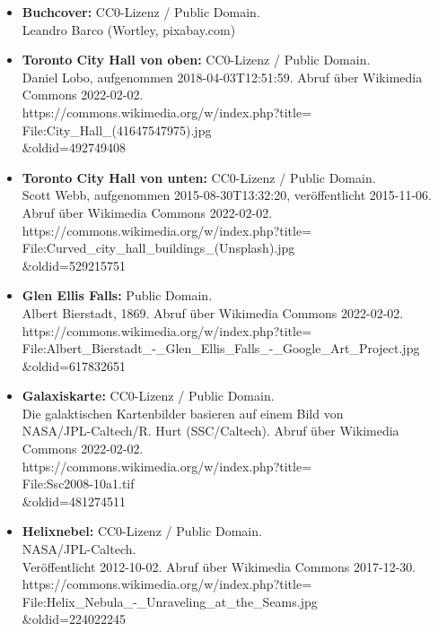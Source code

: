 \begin{itemize}
    \item \textbf{Buchcover:} CC0-Lizenz / Public Domain.\\ Leandro Barco (Wortley, pixabay.com)
    \item \textbf{Toronto City Hall von oben:} CC0-Lizenz / Public Domain.\\ Daniel Lobo, aufgenommen 2018-04-03T12:51:59. Abruf über Wikimedia Commons 2022-02-02.\\ https://commons.wikimedia.org/w/index.php?title=\\File:City\_Hall\_(41647547975).jpg\\\&oldid=492749408
    \item \textbf{Toronto City Hall von unten:} CC0-Lizenz / Public Domain.\\ Scott Webb, aufgenommen 2015-08-30T13:32:20, veröffentlicht 2015-11-06. Abruf über Wikimedia Commons 2022-02-02.\\ https://commons.wikimedia.org/w/index.php?title=\\File:Curved\_city\_hall\_buildings\_(Unsplash).jpg\\\&oldid=529215751
    \item \textbf{Glen Ellis Falls:} Public Domain.\\ Albert Bierstadt, 1869. Abruf über Wikimedia Commons 2022-02-02.\\ https://commons.wikimedia.org/w/index.php?title=\\File:Albert\_Bierstadt\_-\_Glen\_Ellis\_Falls\_-\_Google\_Art\_Project.jpg\\\&oldid=617832651
    \item \textbf{Galaxiskarte:} CC0-Lizenz / Public Domain.\\ Die galaktischen Kartenbilder basieren auf einem Bild von\\ NASA/JPL-Caltech/R. Hurt (SSC/Caltech). Abruf über Wikimedia Commons 2022-02-02.\\ https://commons.wikimedia.org/w/index.php?title=\\File:Ssc2008-10a1.tif\\\&oldid=481274511
    \item \textbf{Helixnebel:} CC0-Lizenz / Public Domain.\\ NASA/JPL-Caltech.\\ Veröffentlicht 2012-10-02. Abruf über Wikimedia Commons 2017-12-30.\\ https://commons.wikimedia.org/w/index.php?title=\\File:Helix\_Nebula\_-\_Unraveling\_at\_the\_Seams.jpg\\\&oldid=224022245
\end{itemize}

